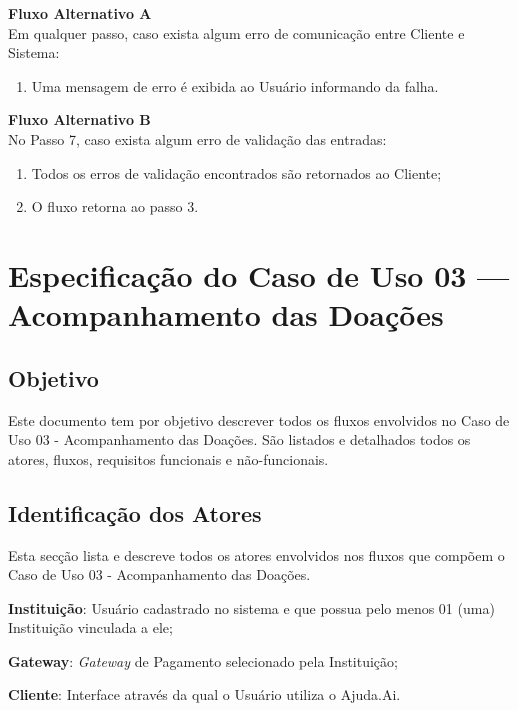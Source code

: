 \begin{anexosenv}
\begin{lista}
    \textbf{Fluxo Alternativo A} \\
    Em qualquer passo, caso exista algum erro de comunicação entre Cliente e Sistema:
    \begin{enumerate}
    \item Uma mensagem de erro é exibida ao Usuário informando da falha.
    \end{enumerate}
    
    \textbf{Fluxo Alternativo B} \\
    No Passo 7, caso exista algum erro de validação das entradas:
    \begin{enumerate}
    \item Todos os erros de validação encontrados são retornados ao Cliente;
    \item O fluxo retorna ao passo 3.
    \end{enumerate}
\end{lista}
\pagebreak

\section*{Especificação do Caso de Uso 03 --- Acompanhamento das Doações}
\subsection*{Objetivo}
Este documento tem por objetivo descrever todos os fluxos envolvidos no Caso de Uso 03 - Acompanhamento das Doações. São listados e detalhados todos os atores, fluxos, requisitos funcionais e não-funcionais.

\subsection*{Identificação dos Atores}
Esta secção lista e descreve todos os atores envolvidos nos fluxos que compõem o Caso de Uso 03 - Acompanhamento das Doações.
\begin{lista}
  \item \textbf{Instituição}: Usuário cadastrado no sistema e que possua pelo menos 01 (uma) Instituição vinculada a ele;
  \item \textbf{Gateway}: \emph{Gateway} de Pagamento selecionado pela Instituição;
  \item \textbf{Cliente}: Interface através da qual o Usuário utiliza o Ajuda.Ai.
\end{lista}


\end{anexosenv}
